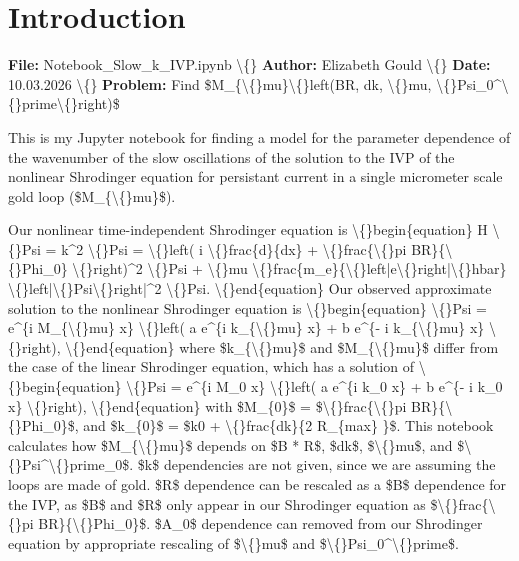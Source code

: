 \documentclass{article}
\begin{document}
\section{Introduction}


\textbf{File:} Notebook\_Slow\_k\_IVP.ipynb 
\textbackslash\{\}
\textbf{Author:} Elizabeth Gould
\textbackslash\{\}
\textbf{Date:} 10.03.2026
\textbackslash\{\}
\textbf{Problem:} Find \$M\_\{\textbackslash\{\}mu\}\textbackslash\{\}left(BR, dk, \textbackslash\{\}mu, \textbackslash\{\}Psi\_0\textasciicircum{}\textbackslash\{\}prime\textbackslash\{\}right)\$

This is my Jupyter notebook for finding a model for the parameter dependence of the wavenumber of the slow oscillations of the solution to the IVP of the nonlinear Shrodinger equation for persistant current in a single micrometer scale gold loop (\$M\_\{\textbackslash\{\}mu\}\$). 

Our nonlinear time-independent Shrodinger equation is
\textbackslash\{\}begin\{equation\}
H \textbackslash\{\}Psi = k\textasciicircum{}2 \textbackslash\{\}Psi = \textbackslash\{\}left( i \textbackslash\{\}frac\{d\}\{dx\} + \textbackslash\{\}frac\{\textbackslash\{\}pi BR\}\{\textbackslash\{\}Phi\_0\} \textbackslash\{\}right)\textasciicircum{}2 \textbackslash\{\}Psi + \textbackslash\{\}mu \textbackslash\{\}frac\{m\_e\}\{\textbackslash\{\}left|e\textbackslash\{\}right|\textbackslash\{\}hbar\} \textbackslash\{\}left|\textbackslash\{\}Psi\textbackslash\{\}right|\textasciicircum{}2 \textbackslash\{\}Psi.
\textbackslash\{\}end\{equation\}
Our observed approximate solution to the nonlinear Shrodinger equation is
\textbackslash\{\}begin\{equation\}
\textbackslash\{\}Psi = e\textasciicircum{}\{i M\_\{\textbackslash\{\}mu\} x\} \textbackslash\{\}left( a e\textasciicircum{}\{i k\_\{\textbackslash\{\}mu\} x\} + b e\textasciicircum{}\{- i k\_\{\textbackslash\{\}mu\} x\} \textbackslash\{\}right),
\textbackslash\{\}end\{equation\}
where \$k\_\{\textbackslash\{\}mu\}\$ and \$M\_\{\textbackslash\{\}mu\}\$ differ from the case of the linear Shrodinger equation, which has a solution of
\textbackslash\{\}begin\{equation\}
\textbackslash\{\}Psi = e\textasciicircum{}\{i M\_0 x\} \textbackslash\{\}left( a e\textasciicircum{}\{i k\_0 x\} + b e\textasciicircum{}\{- i k\_0 x\} \textbackslash\{\}right),
\textbackslash\{\}end\{equation\}
with \$M\_\{0\}\$ = \$\textbackslash\{\}frac\{\textbackslash\{\}pi BR\}\{\textbackslash\{\}Phi\_0\}\$, and \$k\_\{0\}\$ = \$k0 + \textbackslash\{\}frac\{dk\}\{2  R\_\{max\} \}\$. This notebook calculates how \$M\_\{\textbackslash\{\}mu\}\$ depends on \$B * R\$, \$dk\$, \$\textbackslash\{\}mu\$, and \$\textbackslash\{\}Psi\textasciicircum{}\textbackslash\{\}prime\_0\$. \$k\$ dependencies are not given, since we are assuming the loops are made of gold. \$R\$ dependence can be rescaled as a \$B\$ dependence for the IVP, as \$B\$ and \$R\$ only appear in our Shrodinger equation as \$\textbackslash\{\}frac\{\textbackslash\{\}pi BR\}\{\textbackslash\{\}Phi\_0\}\$. \$A\_0\$ dependence can removed from our Shrodinger equation by appropriate rescaling of \$\textbackslash\{\}mu\$ and \$\textbackslash\{\}Psi\_0\textasciicircum{}\textbackslash\{\}prime\$.
\end{document}
